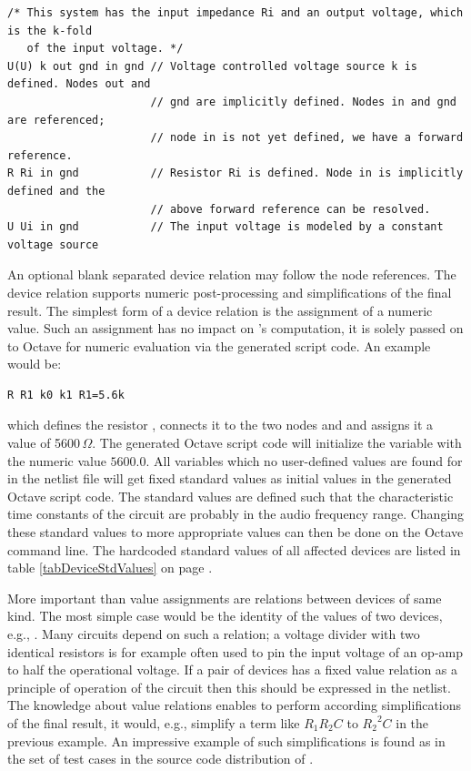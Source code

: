 \begin{verbatim}
/* This system has the input impedance Ri and an output voltage, which is the k-fold
   of the input voltage. */
U(U) k out gnd in gnd // Voltage controlled voltage source k is defined. Nodes out and
                      // gnd are implicitly defined. Nodes in and gnd are referenced;
                      // node in is not yet defined, we have a forward reference.
R Ri in gnd           // Resistor Ri is defined. Node in is implicitly defined and the
                      // above forward reference can be resolved.
U Ui in gnd           // The input voltage is modeled by a constant voltage source
\end{verbatim}

An optional blank separated device relation may follow the node
references. The device relation supports numeric post-processing and
simplifications of the final result. The simplest form of a device
relation is the assignment of a numeric value. Such an assignment has no
impact on \linnet's computation, it is solely passed on to Octave for
numeric evaluation via the generated script code. An example would be:

\begin{verbatim}
R R1 k0 k1 R1=5.6k
\end{verbatim}

\noindent
which defines the resistor , connects it to the two nodes
 and  and assigns it a value of 5600\,$\Omega$. The
generated Octave script code will initialize the variable  with
the numeric value $5600.0$. All variables which no user-defined values are
found for in the netlist file will get fixed standard values as initial
values in the generated Octave script code. The standard values are
defined such that the characteristic time constants of the circuit are
probably in the audio frequency range. Changing these standard values to
more appropriate values can then be done on the Octave command line. The
hardcoded standard values of all affected devices are listed in table
\ref{tabDeviceStdValues} on page \pageref{tabDeviceStdValues}.

More important than value assignments are relations between devices of
same kind. The most simple case would be the identity of the values of two
devices, e.g., . Many circuits depend on such a relation; a
voltage divider with two identical resistors is for example often used to
pin the input voltage of an op-amp to half the operational voltage. If a
pair of devices has a fixed value relation as a principle of operation of
the circuit then this should be expressed in the netlist. The knowledge
about value relations enables \linnet{} to perform according
simplifications of the final result, it would, e.g., simplify a term like
$R_1 R_2 C$ to ${R_2}^2 C$ in the previous example. An impressive example
of such simplifications is found as  in the set of test
cases in the source code distribution of \linnet{}.

